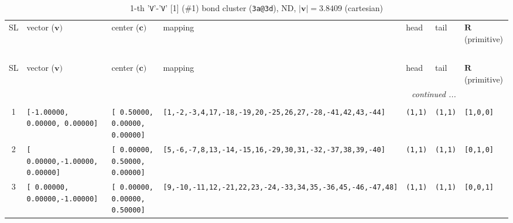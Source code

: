 \documentclass[fleqn,10pt,landscape]{jsarticle}
\begin{document}
\renewcommand{\arraystretch}{1.6}
\begin{longtable}[l]{cllllll}
\captionsetup{justification=raggedright, singlelinecheck=off}
\caption{1-th '\texttt{V}'-'\texttt{V}' [1] (\#1) bond cluster (\texttt{3a@3d}), ND, $|\bm{v}|=3.8409$ (cartesian)}
 \\
 \hline \hline
SL & vector ($\bm{v})$ & center ($\bm{c})$ & mapping & head & tail & $\bm{R}$ (primitive) \\ \hline \endfirsthead

\multicolumn{6}{l}{\tablename\ \thetable{}} \\
 \hline \hline
SL & vector ($\bm{v})$ & center ($\bm{c})$ & mapping & head & tail & $\bm{R}$ (primitive) \\ \hline \endhead

 \hline \hline
\multicolumn{6}{r}{\footnotesize\it continued ...} \\ \endfoot

 \hline \hline
\multicolumn{6}{r}{} \\ \endlastfoot

1 & \texttt{[-1.00000, 0.00000, 0.00000]} & \texttt{[ 0.50000, 0.00000, 0.00000]} & \texttt{[1,-2,-3,4,17,-18,-19,20,-25,26,27,-28,-41,42,43,-44]} & \texttt{(1,1)} & \texttt{(1,1)} & \texttt{[1,0,0]} \\ \hline
2 & \texttt{[ 0.00000,-1.00000, 0.00000]} & \texttt{[ 0.00000, 0.50000, 0.00000]} & \texttt{[5,-6,-7,8,13,-14,-15,16,-29,30,31,-32,-37,38,39,-40]} & \texttt{(1,1)} & \texttt{(1,1)} & \texttt{[0,1,0]} \\ \hline
3 & \texttt{[ 0.00000, 0.00000,-1.00000]} & \texttt{[ 0.00000, 0.00000, 0.50000]} & \texttt{[9,-10,-11,12,-21,22,23,-24,-33,34,35,-36,45,-46,-47,48]} & \texttt{(1,1)} & \texttt{(1,1)} & \texttt{[0,0,1]} \\
\end{longtable}
\renewcommand{\arraystretch}{1.6}
\end{document}
